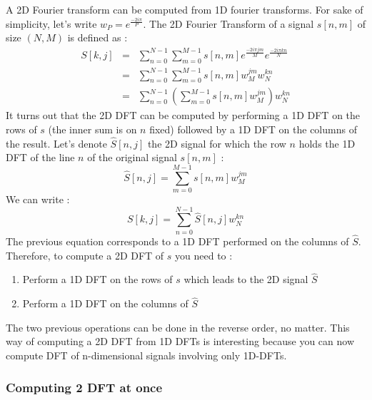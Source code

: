 \documentclass[a4paper,10pt,twoside]{article}
\begin{document}
A 2D Fourier transform can be computed from 1D fourier transforms. For sake of simplicity, let's write $w_P = e^{\frac{-2i\pi}{P}}$. The 2D Fourier Transform of a signal $s[n,m]$ of size $(N,M)$ is defined as :
\begin{eqnarray}
S[k,j] &=& \sum_{n=0}^{N-1} \sum_{m=0}^{M-1} s[n,m] e^{\frac{-2i\pi jm}{M}}e^{\frac{-2i\pi kn}{N}}\\
       &=& \sum_{n=0}^{N-1} \sum_{m=0}^{M-1} s[n,m] w_M^{jm} w_N^{kn}\\
       &=& \sum_{n=0}^{N-1} (\sum_{m=0}^{M-1} s[n,m] w_M^{jm}) w_N^{kn}
\end{eqnarray}
It turns out that the 2D DFT can be computed by performing a 1D DFT on the rows of $s$ (the inner sum is on $n$ fixed) followed by a 1D DFT on the columns of the result. Let's denote $\hat{S}[n,j]$ the 2D signal for which the row $n$ holds the 1D DFT of the line $n$ of the original signal $s[n,m]$ :
\begin{equation}
\hat{S}[n,j] = \sum_{m=0}^{M-1} s[n,m] w_M^{jm}
\end{equation}
We can write :
\begin{equation}
S[k,j] = \sum_{n=0}^{N-1} \hat{S}[n,j] w_N^{kn}
\end{equation}
The previous equation corresponds to a 1D DFT performed on the columns of $\hat{S}$. Therefore, to compute a 2D DFT of $s$ you need to :
\begin{enumerate}
\item Perform a 1D DFT on the rows of $s$ which leads to the 2D signal $\hat{S}$
\item Perform a 1D DFT on the columns of $\hat{S}$
\end{enumerate}
The two previous operations can be done in the reverse order, no matter. This way of computing a 2D DFT from 1D DFTs is interesting because you can now compute DFT of n-dimensional signals involving only 1D-DFTs.

\subsubsection{Computing 2 DFT at once}
\end{document}
